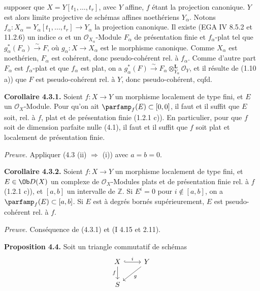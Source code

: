supposer que \(X=Y[t_1,\dots,t_r]\), avec \(Y\) affine, \(f\) étant la projection canonique. \(Y\) est alors limite projective de schémas affines noethériens \(Y_\alpha\). Notons \(f_\alpha:X_\alpha=Y_\alpha[t_1,\dots,t_r]\to Y_\alpha\) la projection canonique. Il existe (EGA IV 8.5.2 et 11.2.6) un indice \(\alpha\) et un \(\mathcal O_{X_\alpha}\)-Module \(F_\alpha\) de présentation finie et \(f_\alpha\)-plat tel que \(g_\alpha^*(F_\alpha)\xrightarrow{\sim}F\), où \(g_\alpha:X\to X_\alpha\) est le morphisme canonique. Comme \(X_\alpha\) est noethérien, \(F_\alpha\) est cohérent, donc pseudo-cohérent rel. à \(f_\alpha\). Comme d'autre part \(F_\alpha\) est \(f_\alpha\)-plat et que \(f_\alpha\) est plat, on a \(g_\alpha^*(F)\xrightarrow{\sim}F_\alpha\otimes^{\mathbf L}_{Y_\alpha}\mathcal O_Y\), et il résulte de (1.10 a)) que \(F\) est pseudo-cohérent rel. à \(Y\), donc pseudo-cohérent, cqfd.

\textbf{Corollaire 4.3.1.} Soient \(f:X\to Y\) un morphisme localement de type fini, et \(E\) un \(\mathcal O_X\)-Module. Pour qu'on ait \(\parfamp_f(E)\subset[0,0]\), il faut et il suffit que \(E\) soit, rel. à \(f\), plat et de présentation finie (1.2.1 c)). En particulier, pour que \(f\) soit de dimension parfaite nulle (4.1), il faut et il suffit que \(f\) soit plat et localement de présentation finie.

\emph{Preuve.} Appliquer (4.3 (ii) \(\Longrightarrow\) (i)) avec \(a=b=0\).

\textbf{Corollaire 4.3.2.} Soient \(f:X\to Y\) un morphisme localement de type fini, et \(E\in\Ob D(X)\) un complexe de \(\mathcal O_X\)-Modules plats et de présentation finie rel. à \(f\) (1.2.1 c)), et \([a,b]\) un intervalle de \(\mathbb Z\). Si \(E^i=0\) pour \(i\notin[a,b]\), on a \(\parfamp_f(E)\subset[a,b]\). Si \(E\) est à degrés bornés supérieurement, \(E\) est pseudo-cohérent rel. à \(f\).

\emph{Preuve.} Conséquence de (4.3.1) et (I 4.15 et 2.11).

\textbf{Proposition 4.4.} Soit un triangle commutatif de schémas
\[
\begin{tikzcd}
X \arrow[r,hook,"i"] \arrow[d,"f"'] & Y \arrow[dl,"g"]\\
S &
\end{tikzcd}
\]
